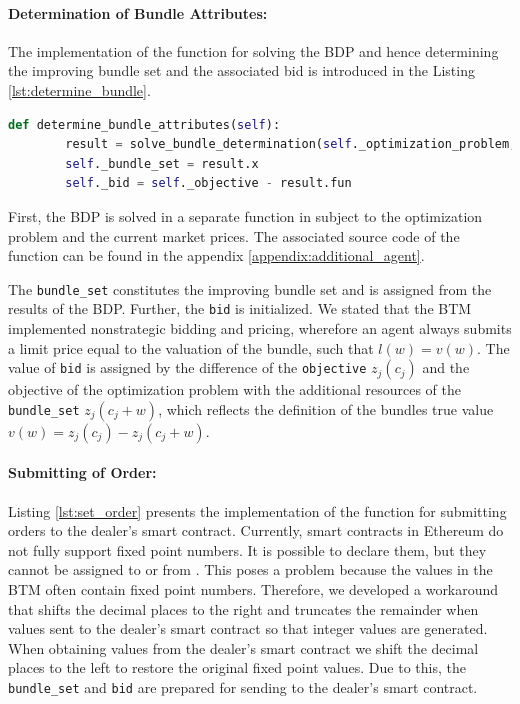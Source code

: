 \paragraph{Determination of Bundle Attributes:} The implementation of the function for solving the BDP and hence determining 
the improving bundle set and the associated bid is introduced in the Listing \ref{lst:determine_bundle}.

\begin{lstlisting}[label=lst:determine_bundle, caption=Determination of Bundle Attribute, language=Python]
    def determine_bundle_attributes(self):
        result = solve_bundle_determination(self._optimization_problem, self._mkt_prices)
        self._bundle_set = result.x
        self._bid = self._objective - result.fun
\end{lstlisting}

First, the BDP is solved in a separate function in subject to the optimization problem and the current market prices.
The associated source code of the function can be found in the appendix \ref{appendix:additional_agent}.

The \verb|bundle_set| constitutes the improving bundle set and is assigned from the results of the BDP.
Further, the \verb|bid| is initialized. We stated that the BTM implemented nonstrategic bidding and pricing,
wherefore an agent always submits a limit price equal to the valuation of the bundle, such that $l(w) = v(w)$.
The value of \verb|bid| is assigned by the difference of the \verb|objective| $z_{j}(c_{j})$ and the 
objective of the optimization problem with the additional resources of the \verb|bundle_set| $z_{j}(c_{j}+w)$, 
which reflects the definition of the bundles true value $v(w) = z_{j}(c_{j}) - z_{j}(c_{j}+w)$.

\paragraph{Submitting of Order:} Listing \ref{lst:set_order} presents the implementation of the function for 
submitting orders to the dealer's smart contract.
Currently, smart contracts in Ethereum do not fully 
support fixed point numbers. It is possible to declare them, but they cannot be assigned to or from .
This poses a problem because the values in the BTM often contain fixed point numbers. Therefore, 
we developed a workaround that shifts the decimal places to the right and truncates
the remainder when values sent to the dealer's smart contract so that integer values are generated.
When obtaining values from the dealer's smart contract we shift the decimal places to the left to restore 
the original fixed point values. 
Due to this, the \verb|bundle_set| and \verb|bid| are prepared for 
sending to the dealer's smart contract.

